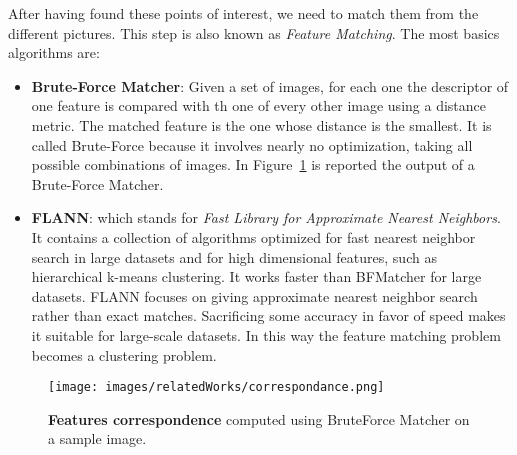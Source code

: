 After having found these points of interest, we need to match them from the different pictures. This step is also known
as \textit{Feature Matching}. The most basics algorithms are:
\begin{itemize}
    \item \textbf{Brute-Force Matcher}: Given a set of images, for each one the descriptor of one feature is compared with th one of every other image using a distance metric.
            The matched feature is the one whose distance is the smallest. It is called Brute-Force because it involves nearly no optimization, taking all possible combinations
            of images. In Figure~\ref{fig:politoCorresponance} is reported the output of a Brute-Force Matcher.
    \item \textbf{FLANN}: which stands for \textit{Fast Library for Approximate Nearest Neighbors}. It contains a collection of algorithms optimized
     for fast nearest neighbor search in large datasets and for high dimensional features, such as hierarchical k-means clustering. It works faster than BFMatcher for large datasets.
     FLANN focuses on giving approximate nearest neighbor search rather than exact matches. Sacrificing some accuracy in favor of speed makes it suitable for large-scale datasets.
     In this way the feature matching problem becomes a clustering problem.

\end{itemize}

\begin{figure}[t]
    \centering
    \texttt{[image: images/relatedWorks/correspondance.png]} %
    \caption{\textbf{Features correspondence} computed using BruteForce Matcher on a sample image.}
    \label{fig:politoCorresponance}
\end{figure}


